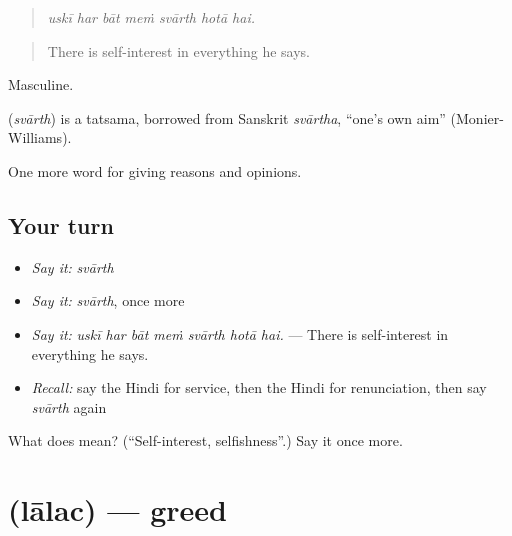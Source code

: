 \begin{quote}
      
\end{quote}

\begin{quote}
\emph{uskī har bāt meṁ svārth hotā hai.}
\end{quote}

\begin{quote}
There is self-interest in everything he says.
\end{quote}

Masculine.

\begin{cousinweb}
\textbf{} (\emph{svārth}) is a tatsama, borrowed from Sanskrit \emph{svārtha}, \textquotedblleft{}one's own aim\textquotedblright{} (Monier-Williams).
\end{cousinweb}

\begin{grammarlens}[title={What you've built}]
One more word for giving reasons and opinions.
\end{grammarlens}

\subsection*{Your turn}
\begin{itemize}
\raggedright
  \item \emph{Say it:} \emph{svārth}
  \item \emph{Say it:} \emph{svārth}, once more
  \item \emph{Say it:} \emph{uskī har bāt meṁ svārth hotā hai.} — There is self-interest in everything he says.
  \item \emph{Recall:} say the Hindi for service, then the Hindi for renunciation, then say \emph{svārth} again
\end{itemize}

\begin{tcolorbox}[breakable,colback=teal!4,colframe=teal!35!black,title={Before you move on}]
What does  mean? (\textquotedblleft{}Self-interest, selfishness\textquotedblright{}.) Say it once more.
\end{tcolorbox}
\section[\texorpdfstring{\hi{लालच} (lālac)}{लालच (lālac)}]{ (lālac) — greed}

